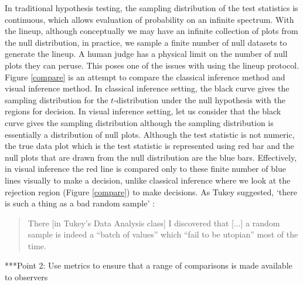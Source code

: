 \documentclass[12]{article}
\begin{document}
In traditional hypothesis testing, the sampling distribution of the test statistics is continuous, which allows evaluation of probability on an infinite spectrum. With the lineup, although conceptually we may have an infinite collection of plots from the null distribution, in practice, we sample a finite number of null datasets to generate the lineup. A human judge has a physical limit on the number of null plots they can peruse. This poses one of the issues with using the lineup protocol.  Figure \ref{compare} is an attempt to compare the classical inference method and visual inference method. In classical inference setting, the black curve  gives the sampling distribution for the $t$-distribution under the null hypothesis with the regions for decision. In visual inference setting, let us consider that the black curve gives the sampling distribution although the sampling distribution is essentially a distribution of null plots. Although the test statistic is not numeric, the true data plot which is the test statistic is represented using red bar and the null plots that are drawn from the null distribution are the blue bars. %
Effectively,  in visual inference the red line is compared only to these finite number of blue lines visually to make a decision, unlike classical inference where we look at the rejection region (Figure \ref{compare}) to make decisions. As Tukey suggested, `there is such a thing as a bad random sample' \citep{fernholz03}:

\begin{quotation}
There [in Tukey's Data Analysis class] I discovered that [...]  a random sample is indeed a ``batch of values'' which ``fail to be utopian'' most of the time.
\end{quotation}


***Point 2: Use metrics to ensure that a range of comparisons is made available to observers
\end{document}
